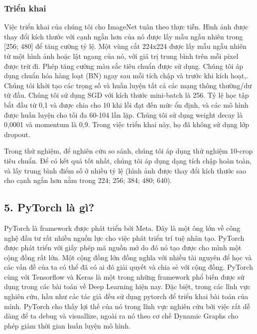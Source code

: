 \documentclass[../main.tex]{subfiles}
\begin{document}
\subsubsection*{Triển khai}

Việc triển khai của chúng tôi cho ImageNet tuân theo thực tiễn. Hình ảnh được thay đổi kích thước với cạnh ngắn hơn của nó được lấy mẫu ngẫu nhiên trong [256; 480] để tăng cường tỷ lệ. Một vùng cắt 224x224 được lấy mẫu ngẫu nhiên từ một hình ảnh hoặc lật ngang của nó, với giá trị trung bình trên mỗi pixel được trừ đi. Phép tăng cường màu sắc tiêu chuẩn được sử dụng. Chúng tôi áp dụng chuẩn hóa hàng loạt (BN) ngay sau mỗi tích chập và trước khi kích hoạt,. Chúng tôi khởi tạo các trọng số và huấn luyện tất cả các mạng thông thường/dư từ đầu. Chúng tôi sử dụng SGD với kích thước mini-batch là 256. Tỷ lệ học tập bắt đầu từ 0,1 và được chia cho 10 khi lỗi đạt đến mức ổn định, và các mô hình được huấn luyện cho tối đa 60-104 lần lặp. Chúng tôi sử dụng weight decay là 0,0001 và momentum là 0,9. Trong việc triển khai này, họ đã không sử dụng lớp dropout.

Trong thử nghiệm, để nghiên cứu so sánh, chúng tôi áp dụng thử nghiệm 10-crop tiêu chuẩn. Để có kết quả tốt nhất, chúng tôi áp dụng dạng tích chập hoàn toàn, và lấy trung bình điểm số ở nhiều tỷ lệ (hình ảnh được thay đổi kích thước sao cho cạnh ngắn hơn nằm trong {224; 256; 384; 480; 640}).

\subsection*{5. PyTorch là gì?}

PyTorch là framework được phát triển bởi Meta. Đây là một ông lớn về công nghệ đầu tư rất nhiều nguồn lực cho việc phát triển trí tuệ nhân tạo. PyTorch được phát triển với giấy phép mã nguồn mở do đó nó tạo được cho mình một cộng đồng rất lớn. Một cộng đồng lớn đồng nghĩa với nhiều tài nguyên để học và các vấn đề của ta có thể đã có ai đó giải quyết và chia sẻ với cộng đồng. PyTorch cùng với Tensorflow và Keras là một trong những framework phổ biến được sử dụng trong các bài toán về Deep Learning hiện nay. Đặc biệt, trong các lĩnh vực nghiên cứu, hầu như các tác giả đều sử dụng pytorch để triển khai bài toán của mình. PyTorch cho thấy lợi thế của nó trong lĩnh vực nghiên cứu bởi việc rất dễ dàng để ta debug và visuallize, ngoài ra nó theo cơ chế Dynamic Graphs cho phép giảm thời gian huấn luyện mô hình.
\end{document}
